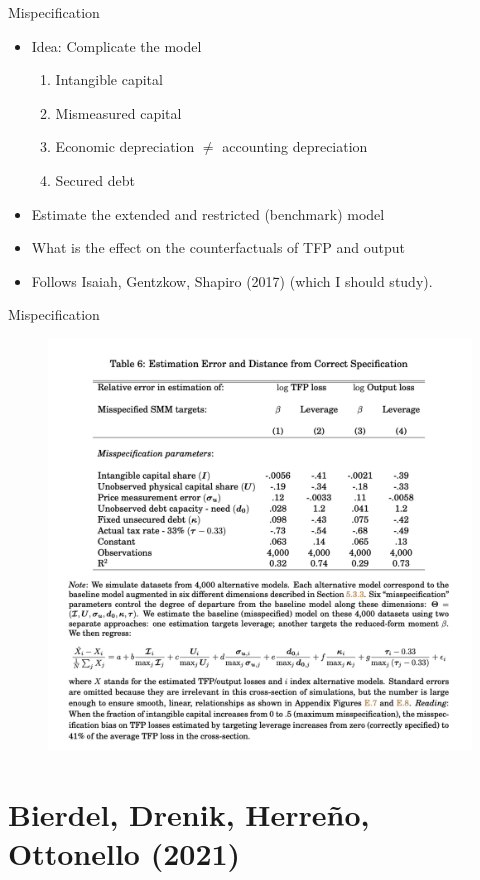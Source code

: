 \documentclass[english,xcolor=svgnames,aspectratio=169]{beamer}
\begin{document}
\begin{frame}{Mispecification}
\begin{itemize}
\item Idea: Complicate the model
\begin{enumerate}
\item Intangible capital
\item Mismeasured capital
\item Economic depreciation $\neq$ accounting depreciation
\item Secured debt
\end{enumerate}
\item Estimate the extended and restricted (benchmark) model
\item What is the effect on the counterfactuals of TFP and output
\item Follows Isaiah, Gentzkow, Shapiro (2017) (which I should study).
\end{itemize}
\end{frame}

\begin{frame}{Mispecification}
\begin{figure}
\includegraphics[scale=0.35]{figures/cchst_4}
\end{figure}
\end{frame}

\section{Bierdel, Drenik, Herre\~no, Ottonello (2021)}
\end{document}
